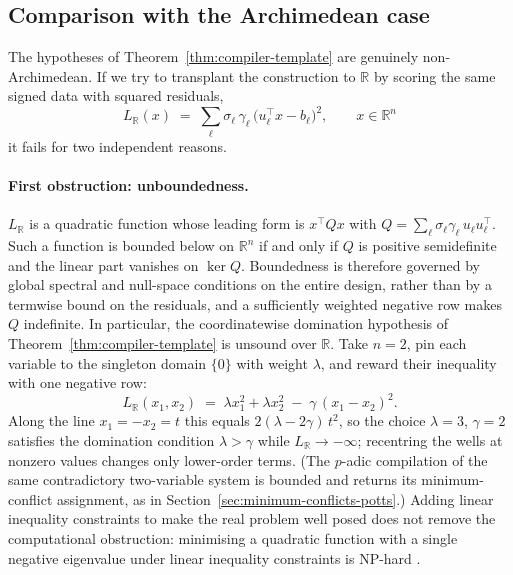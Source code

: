 \documentclass[11pt]{article}
\begin{document}
\subsection{Comparison with the Archimedean case}
\label{sec:archimedean-comparison}

The hypotheses of Theorem~\ref{thm:compiler-template} are genuinely
non-Archimedean. If we try to transplant the construction to \(\mathbb{R}\) by
scoring the same signed data with squared residuals,
\begin{equation*}
L_{\mathbb{R}}(x) \;=\; \sum_{\ell} \sigma_\ell\,\gamma_\ell\,
\bigl(u_\ell^{\top}x - b_\ell\bigr)^{2},
\qquad x \in \mathbb{R}^{n}
\end{equation*}
it fails for two independent reasons.

\paragraph{First obstruction: unboundedness.}
\(L_{\mathbb{R}}\) is a quadratic function whose leading form is
$x^{\top}Qx$ with
$Q = \sum_{\ell}\sigma_\ell\gamma_\ell\,u_\ell u_\ell^{\top}$. Such a
function is bounded below on $\mathbb{R}^{n}$ if and only if $Q$ is
positive semidefinite and the linear part vanishes on $\ker Q$.
Boundedness is therefore governed by global spectral and null-space
conditions on the entire design, rather than by a termwise bound on the
residuals, and a sufficiently weighted negative row makes $Q$
indefinite. In particular, the coordinatewise domination hypothesis of
Theorem~\ref{thm:compiler-template} is unsound over $\mathbb{R}$. Take
$n=2$, pin each variable to the singleton domain $\{0\}$ with weight
$\lambda$, and reward their inequality with one negative row:
\begin{equation*}
L_{\mathbb{R}}(x_1,x_2) \;=\; \lambda x_1^{2} + \lambda x_2^{2}
\;-\; \gamma\,(x_1-x_2)^{2}.
\end{equation*}
Along the line $x_1=-x_2=t$ this equals $2(\lambda-2\gamma)\,t^{2}$, so
the choice $\lambda=3$, $\gamma=2$ satisfies the domination condition
$\lambda>\gamma$ while $L_{\mathbb{R}}\to-\infty$; recentring the wells
at nonzero values changes only lower-order terms. (The $p$-adic
compilation of the same contradictory two-variable system is bounded and
returns its minimum-conflict assignment, as in
Section~\ref{sec:minimum-conflicts-potts}.) Adding linear inequality
constraints to make the real problem well posed does not remove the
computational obstruction: minimising a quadratic function with a single
negative eigenvalue under linear inequality constraints is NP-hard
\cite{PardalosVavasis1991}.
\end{document}
